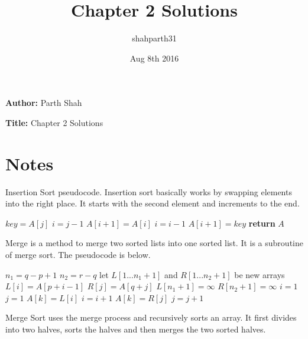 \documentclass{article}
\title{Chapter 2 Solutions}
\author{shahparth31}
\date{Aug 8th 2016}
\begin{document}
\setlength{\parindent}{0pt}

\medskip

\hrulefill

\medskip

{\bf Author:} Parth Shah

\medskip

{\bf Title:} Chapter 2 Solutions

\hrulefill

\section*{Notes}
Insertion Sort pseudocode. Insertion sort basically works by swapping elements into the right place. It starts with the second element and increments to the end.

\medskip

\begin{algorithm}
\begin{algorithmic}[1]
	\State $key = A[j]$
	\State $i = j-1$
		\State $A[i+1] = A[i]$
		\State $i = i-1$
	\EndWhile
	\State $A[i+1] = key$
\EndFor
\State \textbf{return} $A$
\EndProcedure
\end{algorithmic}
\end{algorithm}

\medskip

Merge is a method to merge two sorted lists into one sorted list. It is a subroutine of merge sort. The pseudocode is below.

\medskip

\begin{algorithm}
\begin{algorithmic}[1]
\State $n_1 = q - p + 1$
\State $n_2 = r - q$
\State let $L[1...n_1 + 1]$ and $R[1...n_2 + 1]$ be new arrays
	\State $L[i] = A[p+i-1]$
\EndFor
{}
	\State $R[j] = A[q+j]$
\EndFor
\State $L[n_1+1] = \infty$
\State $R[n_2+1] = \infty$
\State $i = 1$
\State $j = 1$
		\State $A[k] = L[i]$
		\State $i = i + 1$
	\Else
		\State $A[k] = R[j]$
		\State $j = j + 1$
	\EndIf
\EndFor
\EndProcedure
\end{algorithmic}
\end{algorithm}

\medskip

Merge Sort uses the merge process and recursively sorts an array. It first divides into two halves, sorts the halves and then merges the two sorted halves.
\end{document}
